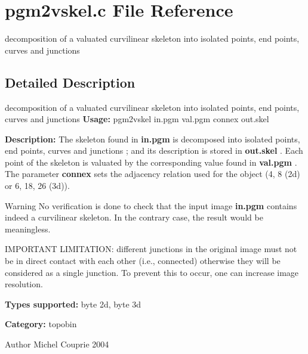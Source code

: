 \section{pgm2vskel.c File Reference}
\label{pgm2vskel_8c}


decomposition of a valuated curvilinear skeleton into isolated points, end points, curves and junctions  




\subsection{Detailed Description}
decomposition of a valuated curvilinear skeleton into isolated points, end points, curves and junctions {\bfseries Usage:} pgm2vskel in.pgm val.pgm connex out.skel

{\bfseries Description:} The skeleton found in {\bfseries in.pgm} is decomposed into isolated points, end points, curves and junctions ; and its description is stored in {\bfseries out.skel} . Each point of the skeleton is valuated by the corresponding value found in {\bfseries val.pgm} . The parameter {\bfseries connex} sets the adjacency relation used for the object (4, 8 (2d) or 6, 18, 26 (3d)).

\begin{DoxyWarning}{Warning}
No verification is done to check that the input image {\bfseries in.pgm} contains indeed a curvilinear skeleton. In the contrary case, the result would be meaningless.

IMPORTANT LIMITATION: different junctions in the original image must not be in direct contact with each other (i.e., connected) otherwise they will be considered as a single junction. To prevent this to occur, one can increase image resolution.
\end{DoxyWarning}
{\bfseries Types supported:} byte 2d, byte 3d

{\bfseries Category:} topobin

\begin{DoxyAuthor}{Author}
Michel Couprie 2004 
\end{DoxyAuthor}
